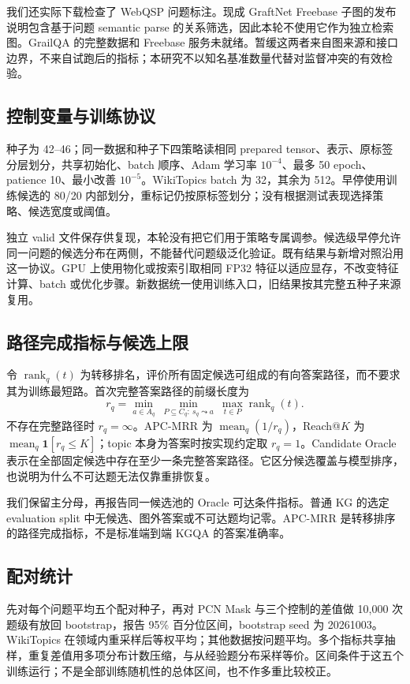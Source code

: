 \documentclass[UTF8,a4paper,10pt,fontset=fandol]{ctexart}
\begin{document}
我们还实际下载检查了 WebQSP 问题标注。现成 GraftNet Freebase 子图的发布说明包含基于问题 semantic parse 的关系筛选，因此本轮不使用它作为独立检索图。GrailQA 的完整数据和 Freebase 服务未就绪。暂缓这两者来自图来源和接口边界，不来自试跑后的指标；本研究不以知名基准数量代替对监督冲突的有效检验。

\subsection{控制变量与训练协议}
种子为 42--46；同一数据和种子下四策略读相同 prepared tensor、表示、原标签分层划分，共享初始化、batch 顺序、Adam 学习率 $10^{-4}$、最多 50 epoch、patience 10、最小改善 $10^{-5}$。WikiTopics batch 为 32，其余为 512。早停使用训练候选的 80/20 内部划分，重标记仍按原标签划分；没有根据测试表现选择策略、候选宽度或阈值。

独立 valid 文件保存供复现，本轮没有把它们用于策略专属调参。候选级早停允许同一问题的候选分布在两侧，不能替代问题级泛化验证。既有结果与新增对照沿用这一协议。GPU 上使用物化或按索引取相同 FP32 特征以适应显存，不改变特征计算、batch 或优化步骤。新数据统一使用训练入口，旧结果按其完整五种子来源复用。

\subsection{路径完成指标与候选上限}
令 $\operatorname{rank}_q(t)$ 为转移排名，评价所有固定候选可组成的有向答案路径，而不要求其为训练最短路。首次完整答案路径的前缀长度为
\begin{equation}
r_q=\min_{a\in A_q}\ \min_{P\subseteq C_q:\ s_q\leadsto a}\ \max_{t\in P}\operatorname{rank}_q(t).
\end{equation}
不存在完整路径时 $r_q=\infty$。APC-MRR 为 $\operatorname{mean}_q(1/r_q)$，Reach@$K$ 为 $\operatorname{mean}_q\mathbf1[r_q\le K]$；topic 本身为答案时按实现约定取 $r_q=1$。Candidate Oracle 表示在全部固定候选中存在至少一条完整答案路径。它区分候选覆盖与模型排序，也说明为什么不可达题无法仅靠重排恢复。

我们保留主分母，再报告同一候选池的 Oracle 可达条件指标。普通 KG 的选定 evaluation split 中无候选、图外答案或不可达题均记零。APC-MRR 是转移排序的路径完成指标，不是标准端到端 KGQA 的答案准确率。

\subsection{配对统计}
先对每个问题平均五个配对种子，再对 PCN Mask 与三个控制的差值做 10,000 次题级有放回 bootstrap，报告 95\% 百分位区间，bootstrap seed 为 20261003。WikiTopics 在领域内重采样后等权平均；其他数据按问题平均。多个指标共享抽样，重复差值用多项分布计数压缩，与从经验题分布采样等价。区间条件于这五个训练运行；不是全部训练随机性的总体区间，也不作多重比较校正。
\end{document}
